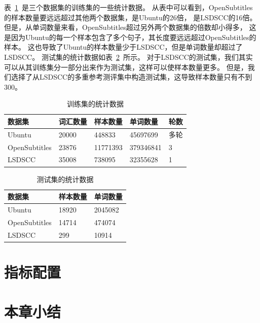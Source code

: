 表~\ref{tab:train_set_stats}~是三个数据集的训练集的一些统计数据。
从表中可以看到，OpenSubtitles的样本数量要远远超过其他两个数据集，是Ubuntu的26倍， 是LSDSCC的16倍。
但是，从单词数量来看，OpenSubtitles超过另外两个数据集的倍数却小得多，
这是因为Ubuntu的每一个样本包含了多个句子，其长度要远远超过OpenSubtitles的样本。
这也导致了Ubuntu的样本数量少于LSDSCC，但是单词数量却超过了LSDSCC。
测试集的统计数据如表~\ref{tab:test_set_stats}~所示。
对于LSDSCC的测试集，我们其实可以从其训练集分一部分出来作为测试集，这样可以使样本数量更多。
但是，我们选择了从LSDSCC的多重参考测评集中构造测试集，这导致样本数量只有不到300。

\begin{table}[H]
    \centering
    \caption{训练集的统计数据}
    \label{tab:train_set_stats}
    \begin{tabular}{lllll}
        \toprule
        数据集 & 词汇数量 & 样本数量 & 单词数量 & 轮数 \\
        \midrule
        Ubuntu & 20000 & 448833 & 45697699 & 多轮 \\
        OpenSubtitles & 23876 & 11771393 & 379346841 & 3 \\
        LSDSCC & 35008 & 738095 & 32355628 & 1 \\
        \bottomrule
    \end{tabular}
\end{table}

\begin{table}[H]
    \centering
    \caption{测试集的统计数据}
    \label{tab:test_set_stats}
    \begin{tabular}{lll}
        \toprule
        数据集 & 样本数量 & 单词数量 \\
        \midrule
        Ubuntu & 18920 & 2045082   \\
        OpenSubtitles & 14714 & 474074 \\
        LSDSCC & 299 & 10914 \\
        \bottomrule
    \end{tabular}
\end{table}

\section{指标配置}\label{sec:metric_config}

\section{本章小结}\label{sec:method_conclusion}
